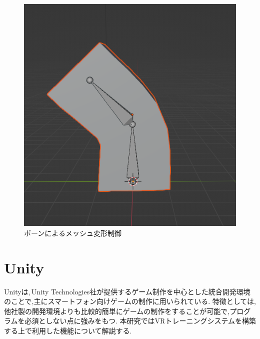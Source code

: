 \documentclass{ltjsreport}
\begin{document}
\begin{figure}[H]
\begin{minipage}{0.3\columnwidth}
			\includegraphics[width = \columnwidth]{../figs/bonecheck.png}
			\end{minipage}
			\caption{ボーンによるメッシュ変形制御}
			\label{fig:bonecontrol}
			\end{figure}
\vspace{-15pt}

	\section{Unity}
		Unityは,\,Unity Technologies社が提供するゲーム制作を中心とした統合開発環境のことで,主にスマートフォン向けゲームの制作に用いられている.
		特徴としては,他社製の開発環境よりも比較的簡単にゲームの制作をすることが可能で,プログラムを必須としない点に強みをもつ.
		本研究ではVRトレーニングシステムを構築する上で利用した機能について解説する.
\end{document}
